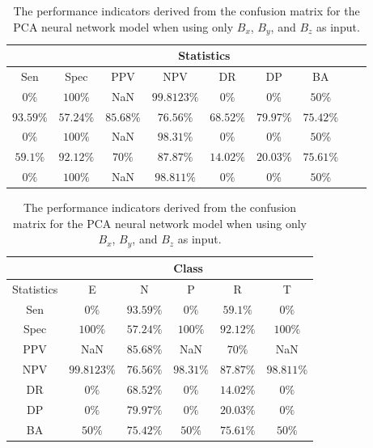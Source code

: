 \begin{table}[!ht]
	\centering
	\begin{tabular}{|c|c|c|c|c|c|c|c|c|}
		\hline
		 & \multicolumn{7}{c|}{Statistics} \\ \hline
		Sen & Spec & PPV & NPV & DR & DP & BA \\ \hline
		$0\%$ & $100\%$ & NaN & $99.8123\%$ & $0\%$ & $0\%$ & $50\%$ \\ \hline
		$93.59\%$ & $57.24\%$ & $85.68\%$ & $76.56\%$ & $68.52\%$ & $79.97\%$ & $75.42\%$ \\ \hline
		$0\%$ & $100\%$ & NaN & $98.31\%$ & $0\%$ & $0\%$ & $50\%$ \\ \hline
		$59.1\%$ & $92.12\%$ & $70\%$ & $87.87\%$ & $14.02\%$ & $20.03\%$ & $75.61\%$ \\ \hline
		$0\%$ & $100\%$ & NaN & $98.811\%$ & $0\%$ & $0\%$ & $50\%$ \\ \hline
	\end{tabular}
	\caption{The performance indicators derived from the confusion matrix for the PCA neural network model when using only $B_{x}$, $B_{y}$, and $B_{z}$ as input.}
	\label{tab:cs:coord:pcaNNet}
\end{table}

\begin{table}[!ht]
	\centering
	\begin{tabular}{|c|c|c|c|c|c|}
		\hline
		 & \multicolumn{5}{c|}{Class} \\ \hline
		Statistics & E & N & P & R & T \\ \hline
		Sen & $0\%$ & $93.59\%$ & $0\%$ & $59.1\%$ & $0\%$ \\ \hline
		Spec & $100\%$ & $57.24\%$ & $100\%$ & $92.12\%$ & $100\%$ \\ \hline
		PPV & NaN & $85.68\%$ & NaN & $70\%$ & NaN \\ \hline
		NPV & $99.8123\%$ & $76.56\%$ & $98.31\%$ & $87.87\%$ & $98.811\%$ \\ \hline
		DR & $0\%$ & $68.52\%$ & $0\%$ & $14.02\%$ & $0\%$ \\ \hline
		DP & $0\%$ & $79.97\%$ & $0\%$ & $20.03\%$ & $0\%$ \\ \hline
		BA & $50\%$ & $75.42\%$ & $50\%$ & $75.61\%$ & $50\%$ \\ \hline
	\end{tabular}
	\caption{The performance indicators derived from the confusion matrix for the PCA neural network model when using only $B_{x}$, $B_{y}$, and $B_{z}$ as input.}
	\label{tab:cs:reverse:coord:pcaNNet}
\end{table}


